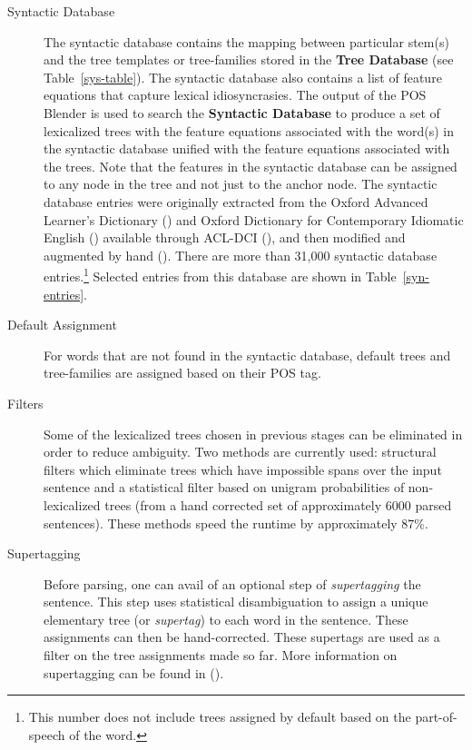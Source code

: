 \begin{description}
\item[Syntactic Database] The syntactic database contains the mapping
  between particular stem(s) and the tree templates or tree-families
  stored in the {\bf Tree Database} (see Table~\ref{sys-table}). The
  syntactic database also contains a list of feature equations that
  capture lexical idiosyncrasies. The output of the POS Blender is
  used to search the {\bf Syntactic Database} to produce a set of
  lexicalized trees with the feature equations associated with the
  word(s) in the syntactic database unified with the feature equations
  associated with the trees. Note that the features in the syntactic
  database can be assigned to any node in the tree and not just to the
  anchor node. The syntactic database entries were originally
  extracted from the Oxford Advanced Learner's Dictionary
  (\cite{oald74}) and Oxford Dictionary for Contemporary Idiomatic
  English (\cite{cie75}) available through ACL-DCI
  (\cite{liberman89}), and then modified and augmented by hand
  (\cite{EgediMartin94}).  There are more than 31,000 syntactic
  database entries.\footnote{This number does not include trees
    assigned by default based on the part-of-speech of the word.}
  Selected entries from this database are shown in
  Table~\ref{syn-entries}.
    
\item[Default Assignment] For words that are not found in the
  syntactic database, default trees and tree-families are assigned
  based on their POS tag.
  
\item[Filters] Some of the lexicalized trees chosen in previous stages
  can be eliminated in order to reduce ambiguity. Two methods are
  currently used: structural filters which eliminate trees which have
  impossible spans over the input sentence and a statistical filter
  based on unigram probabilities of non-lexicalized trees (from a hand
  corrected set of approximately 6000 parsed sentences). These methods
  speed the runtime by approximately 87\%.
  
\item[Supertagging] Before parsing, one can avail of an optional step
  of {\em supertagging} the sentence. This step uses statistical
  disambiguation to assign a unique elementary tree (or {\em
    supertag}) to each word in the sentence. These assignments can
  then be hand-corrected. These supertags are used as a filter on the
  tree assignments made so far. More information on supertagging can
  be found in (\cite{srini97diss,srini97iwpt}).

\end{description}


